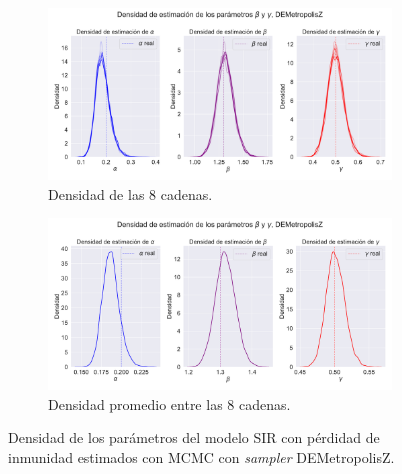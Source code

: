 \begin{figure}[h]
    \centering
    \begin{subfigure}[b]{\linewidth}
        \centering
        \includegraphics[width=0.55\linewidth]{img/content/chapter4/DEMetropolis_sir_rec_params_density.pdf}
        \caption{Densidad de las 8 cadenas.}
    \end{subfigure}
     \begin{subfigure}[b]{\linewidth}
        \centering
        \includegraphics[width=0.55\linewidth]{img/content/chapter4/DEMetropolis_sir_rec_params_density_mean.pdf}
        \caption{Densidad promedio entre las 8 cadenas.}
    \end{subfigure}
    \caption{Densidad de los parámetros del modelo SIR con pérdidad de inmunidad estimados con MCMC con \textit{sampler} DEMetropolisZ.}
\end{figure}

